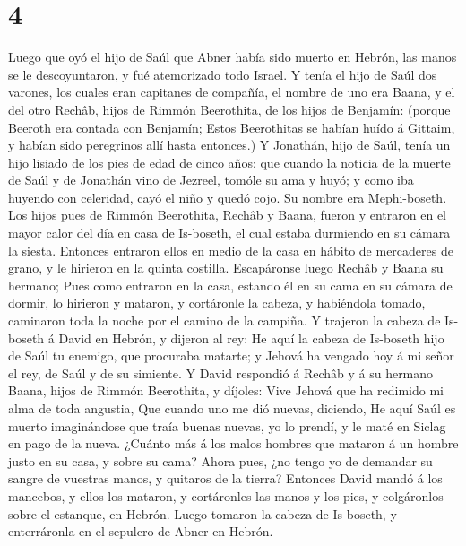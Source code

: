 \hypertarget{section-3}{%
\section{4}\label{section-3}}

 Luego que oyó el hijo de Saúl que Abner había sido muerto
en Hebrón, las manos se le descoyuntaron, y fué atemorizado todo Israel.
 Y tenía el hijo de Saúl dos varones, los cuales eran
capitanes de compañía, el nombre de uno era Baana, y el del otro Rechâb,
hijos de Rimmón Beerothita, de los hijos de Benjamín: (porque Beeroth
era contada con Benjamín;  Estos Beerothitas se habían huído
á Gittaim, y habían sido peregrinos allí hasta entonces.)  Y
Jonathán, hijo de Saúl, tenía un hijo lisiado de los pies de edad de
cinco años: que cuando la noticia de la muerte de Saúl y de Jonathán
vino de Jezreel, tomóle su ama y huyó; y como iba huyendo con celeridad,
cayó el niño y quedó cojo. Su nombre era Mephi-boseth.  Los
hijos pues de Rimmón Beerothita, Rechâb y Baana, fueron y entraron en el
mayor calor del día en casa de Is-boseth, el cual estaba durmiendo en su
cámara la siesta.  Entonces entraron ellos en medio de la
casa en hábito de mercaderes de grano, y le hirieron en la quinta
costilla. Escapáronse luego Rechâb y Baana su hermano;  Pues
como entraron en la casa, estando él en su cama en su cámara de dormir,
lo hirieron y mataron, y cortáronle la cabeza, y habiéndola tomado,
caminaron toda la noche por el camino de la campiña.  Y
trajeron la cabeza de Is-boseth á David en Hebrón, y dijeron al rey: He
aquí la cabeza de Is-boseth hijo de Saúl tu enemigo, que procuraba
matarte; y Jehová ha vengado hoy á mi señor el rey, de Saúl y de su
simiente.  Y David respondió á Rechâb y á su hermano Baana,
hijos de Rimmón Beerothita, y díjoles: Vive Jehová que ha redimido mi
alma de toda angustia,  Que cuando uno me dió nuevas,
diciendo, He aquí Saúl es muerto imaginándose que traía buenas nuevas,
yo lo prendí, y le maté en Siclag en pago de la nueva. 
¿Cuánto más á los malos hombres que mataron á un hombre justo en su
casa, y sobre su cama? Ahora pues, ¿no tengo yo de demandar su sangre de
vuestras manos, y quitaros de la tierra?  Entonces David
mandó á los mancebos, y ellos los mataron, y cortáronles las manos y los
pies, y colgáronlos sobre el estanque, en Hebrón. Luego tomaron la
cabeza de Is-boseth, y enterráronla en el sepulcro de Abner en Hebrón.

